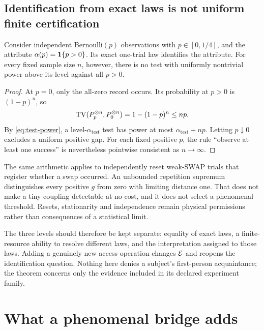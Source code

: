 \subsection{Identification from exact laws is not uniform finite certification}
\begin{proposition}\label{p2-29}
Consider independent Bernoulli\((p)\) observations with \(p\in[0,1/4]\), and the attribute \(\alpha(p)=\mathbf 1\{p>0\}\). Its exact one-trial law identifies the attribute. For every fixed sample size \(n\), however, there is no test with uniformly nontrivial power above its level against all \(p>0\).
\end{proposition}
\begin{proof}
At \(p=0\), only the all-zero record occurs. Its probability at \(p>0\) is \((1-p)^n\), so
\begin{equation}\label{eq:bernoulli-tv}
 \operatorname{TV}(P_p^{\otimes n},P_0^{\otimes n})
 =1-(1-p)^n\le np.
\end{equation}
By \cref{eq:test-power}, a level-\(\alpha_{\mathrm{test}}\) test has power at most \(\alpha_{\mathrm{test}}+np\). Letting \(p\downarrow0\) excludes a uniform positive gap. For each fixed positive \(p\), the rule ``observe at least one success'' is nevertheless pointwise consistent as \(n\to\infty\).
\end{proof}
The same arithmetic applies to independently reset weak-SWAP trials that register whether a swap occurred. An unbounded repetition supremum distinguishes every positive \(g\) from zero with limiting distance one. That does not make a tiny coupling detectable at no cost, and it does not select a phenomenal threshold. Resets, stationarity and independence remain physical permissions rather than consequences of a statistical limit.

The three levels should therefore be kept separate: equality of exact laws, a finite-resource ability to resolve different laws, and the interpretation assigned to those laws. Adding a genuinely new access operation changes \(\mathcal E\) and reopens the identification question. Nothing here denies a subject's first-person acquaintance; the theorem concerns only the evidence included in its declared experiment family.



\section{What a phenomenal bridge adds}\label{sec:bridge}
